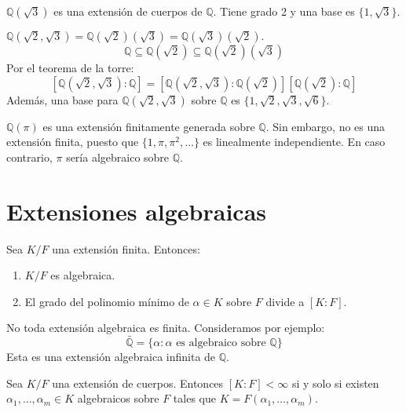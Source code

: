 \begin{example}
    $\mathbb{Q}(\sqrt{3})$ es una extensión de cuerpos de $\mathbb{Q}$. Tiene grado 2 y una base es $\{ 1, \sqrt{3} \}$.
\end{example}

\begin{example}
    $\mathbb{Q}(\sqrt{2}, \sqrt{3}) = \mathbb{Q}(\sqrt{2})(\sqrt{3}) = \mathbb{Q}(\sqrt{3})(\sqrt{2}).$
    $$\mathbb{Q} \subseteq \mathbb{Q}(\sqrt{2}) \subseteq \mathbb{Q}(\sqrt{2})(\sqrt{3})$$
    Por el teorema de la torre:
    $$[\mathbb{Q}(\sqrt{2}, \sqrt{3}) : \mathbb{Q}] = [\mathbb{Q}(\sqrt{2}, \sqrt{3}) : \mathbb{Q}(\sqrt{2})] [\mathbb{Q}(\sqrt{2}) : \mathbb{Q}]$$
    Además, una base para $\mathbb{Q}(\sqrt{2}, \sqrt{3})$ sobre $\mathbb{Q}$ es $\{ 1, \sqrt{2}, \sqrt{3}, \sqrt{6} \}$.
\end{example}

\begin{example}
    $\mathbb{Q}(\pi)$ es una extensión finitamente generada sobre $\mathbb{Q}$.
    Sin embargo, no es una extensión finita, puesto que $\{ 1, \pi, \pi^2, \ldots\}$ es linealmente independiente.
    En caso contrario, $\pi$ sería algebraico sobre $\mathbb{Q}$.
\end{example}

\section{Extensiones algebraicas}

\begin{proposition}
    Sea $K/F$ una extensión finita. Entonces:
    \begin{enumerate}
        \item $K/F$ es algebraica.
        \item El grado del polinomio mínimo de $\alpha \in K$ sobre $F$ divide a $[K : F]$.
    \end{enumerate}
\end{proposition}

\begin{remark}
    No toda extensión algebraica es finita. Consideramos por ejemplo:
    $$\bar{\mathbb{Q}} = \{ \alpha : \alpha \text{ es algebraico sobre } \mathbb{Q} \}$$
    Esta es una extensión algebraica infinita de $\mathbb{Q}$.
\end{remark}

\begin{proposition}
    Sea $K/F$ una extensión de cuerpos. Entonces $[K : F] < \infty$ si y solo si existen $\alpha_1, \dots, \alpha_m \in K$ algebraicos sobre $F$ tales que $K = F(\alpha_1, \dots, \alpha_m)$.
\end{proposition}

